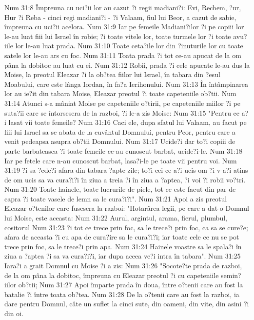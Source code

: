 Num 31:8  Împreuna cu uci?ii lor au cazut ?i regii madiani?i: Evi, Rechem, ?ur, Hur ?i Reba - cinci regi madiani?i - ?i Valaam, fiul lui Beor, a cazut de sabie, împreuna cu uci?ii acelora.
Num 31:9  Iar pe femeile Madiani?ilor ?i pe copiii lor le-au luat fiii lui Israel în robie; ?i toate vitele lor, toate turmele lor ?i toate avu?iile lor le-au luat prada.
Num 31:10  Toate ceta?ile lor din ?inuturile lor cu toate satele lor le-au ars cu foc.
Num 31:11  Toata prada ?i tot ce-au apucat de la om pâna la dobitoc au luat cu ei.
Num 31:12  Robii, prada ?i cele apucate le-au dus la Moise, la preotul Eleazar ?i la ob?tea fiilor lui Israel, în tabara din ?esul Moabului, care este lânga Iordan, în fa?a Ierihonului.
Num 31:13  În întâmpinarea lor au ie?it din tabara Moise, Eleazar preotul ?i toate capeteniile ob?tii.
Num 31:14  Atunci s-a mâniat Moise pe capeteniile o?tirii, pe capeteniile miilor ?i pe suta?ii care se întorsesera de la razboi, ?i le-a zis Moise:
Num 31:15  "Pentru ce a?i lasat vii toate femeile?
Num 31:16  Caci ele, dupa sfatul lui Valaam, au facut pe fiii lui Israel sa se abata de la cuvântul Domnului, pentru Peor, pentru care a venit pedeapsa asupra ob?tii Domnului.
Num 31:17  Ucide?i dar to?i copiii de parte barbateasca ?i toate femeile ce-au cunoscut barbat, ucide?i-le.
Num 31:18  Iar pe fetele care n-au cunoscut barbat, lasa?i-le pe toate vii pentru voi.
Num 31:19  ?i sa ?ede?i afara din tabara ?apte zile; to?i cei ce a?i ucis om ?i v-a?i atins de om ucis sa va cura?i?i în ziua a treia ?i în ziua a ?aptea, ?i voi ?i robii vo?tri.
Num 31:20  Toate hainele, toate lucrurile de piele, tot ce este facut din par de capra ?i toate vasele de lemn sa le cura?i?i".
Num 31:21  Apoi a zis preotul Eleazar o?tenilor care fusesera la razboi: "Hotarârea legii, pe care a dat-o Domnul lui Moise, este aceasta:
Num 31:22  Aurul, argintul, arama, fierul, plumbul, cositorul
Num 31:23  ?i tot ce trece prin foc, sa le trece?i prin foc, ca sa se cure?e; afara de aceasta ?i cu apa de cura?ire sa le cura?i?i; iar toate cele ce nu se pot trece prin foc, sa le trece?i prin apa.
Num 31:24  Hainele voastre sa le spala?i în ziua a ?aptea ?i sa va cura?i?i, iar dupa aceea ve?i intra în tabara".
Num 31:25  Iara?i a grait Domnul cu Moise ?i a zis:
Num 31:26  "Socote?te prada de razboi, de la om pâna la dobitoc, împreuna cu Eleazar preotul ?i cu capeteniile semin?iilor ob?tii;
Num 31:27  Apoi împarte prada în doua, între o?tenii care au fost la batalie ?i între toata ob?tea.
Num 31:28  De la o?tenii care au fost la razboi, ia dare pentru Domnul, câte un suflet la cinci sute, din oameni, din vite, din asini ?i din oi.
